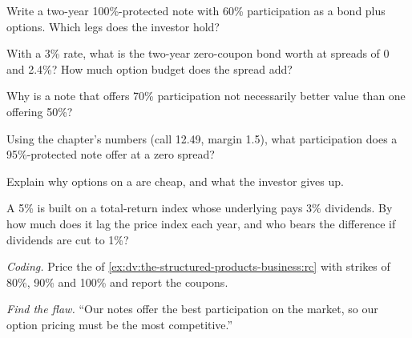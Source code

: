 \begin{exercise}[$\star$]\label{exo:dv:the-structured-products-business:1}
Write a two-year 100\%-protected note with 60\% participation as a bond plus options. Which legs does the investor hold?
\end{exercise}

\begin{exercise}[$\star$]\label{exo:dv:the-structured-products-business:2}
With a 3\% rate, what is the two-year zero-coupon bond worth at spreads of 0 and 2.4\%? How much option budget does the spread add?
\end{exercise}

\begin{exercise}[$\star$]\label{exo:dv:the-structured-products-business:3}
Why is a note that offers 70\% participation not necessarily better value than one offering 50\%?
\end{exercise}

\begin{exercise}[$\star\star$]\label{exo:dv:the-structured-products-business:4}
Using the chapter's numbers (call 12.49, margin 1.5), what participation does a 95\%-protected note offer at a zero spread?
\end{exercise}

\begin{exercise}[$\star\star$]\label{exo:dv:the-structured-products-business:5}
Explain why options on a  are cheap, and what the investor gives up.
\end{exercise}

\begin{exercise}[$\star\star$]\label{exo:dv:the-structured-products-business:6}
A 5\%  is built on a total-return index whose underlying pays 3\% dividends. By how much does it lag the price index each
year, and who bears the difference if dividends are cut to 1\%?
\end{exercise}

\begin{exercise}[$\star\star\star$]\label{exo:dv:the-structured-products-business:7}
\emph{Coding.} Price the  of \cref{ex:dv:the-structured-products-business:rc} with strikes of 80\%, 90\% and 100\% and
report the coupons.
\end{exercise}

\begin{exercise}[$\star\star\star$]\label{exo:dv:the-structured-products-business:8}
\emph{Find the flaw.} ``Our notes offer the best participation on the market, so our option pricing must be the most competitive.''
\end{exercise}


